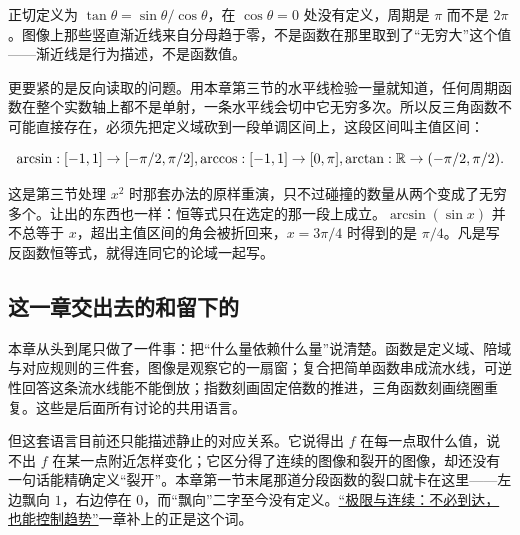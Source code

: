 正切定义为 \(\tan\theta=\sin\theta/\cos\theta\)，在 \(\cos\theta=0\) 处没有定义，周期是 \(\pi\) 而不是 \(2\pi\)。图像上那些竖直渐近线来自分母趋于零，不是函数在那里取到了``无穷大''这个值——渐近线是行为描述，不是函数值。

更要紧的是反向读取的问题。用本章第三节的水平线检验一量就知道，任何周期函数在整个实数轴上都不是单射，一条水平线会切中它无穷多次。所以反三角函数不可能直接存在，必须先把定义域砍到一段单调区间上，这段区间叫主值区间：

\[
\arcsin:[-1,1]\to[-\pi/2,\pi/2],
\space
\arccos:[-1,1]\to[0,\pi],
\space
\arctan:\mathbb{R}\to(-\pi/2,\pi/2).
\]

这是第三节处理 \(x^2\) 时那套办法的原样重演，只不过碰撞的数量从两个变成了无穷多个。让出的东西也一样：恒等式只在选定的那一段上成立。\(\arcsin(\sin x)\) 并不总等于 \(x\)，超出主值区间的角会被折回来，\(x=3\pi/4\) 时得到的是 \(\pi/4\)。凡是写反函数恒等式，就得连同它的论域一起写。

\subsection{这一章交出去的和留下的}

本章从头到尾只做了一件事：把``什么量依赖什么量''说清楚。函数是定义域、陪域与对应规则的三件套，图像是观察它的一扇窗；复合把简单函数串成流水线，可逆性回答这条流水线能不能倒放；指数刻画固定倍数的推进，三角函数刻画绕圈重复。这些是后面所有讨论的共用语言。

但这套语言目前还只能描述静止的对应关系。它说得出 \(f\) 在每一点取什么值，说不出 \(f\) 在某一点附近怎样变化；它区分得了连续的图像和裂开的图像，却还没有一句话能精确定义``裂开''。本章第一节末尾那道分段函数的裂口就卡在这里——左边飘向 \(1\)，右边停在 \(0\)，而``飘向''二字至今没有定义。\hyperref[ch:010]{``极限与连续：不必到达，也能控制趋势''}一章补上的正是这个词。
